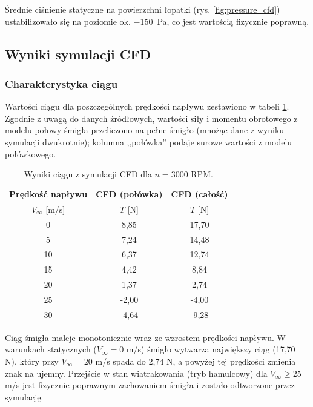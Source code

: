 \documentclass[12pt,a4paper,twoside]{article}
\begin{document}
	Średnie ciśnienie statyczne na powierzchni łopatki (rys. \ref{fig:pressure_cfd}) ustabilizowało się na poziomie ok. \SI{-150}{\pascal}, co jest wartością fizycznie poprawną.
	
	\subsection{Wyniki symulacji CFD}
	
	\subsubsection{Charakterystyka ciągu}
	Wartości ciągu dla poszczególnych prędkości napływu zestawiono w tabeli \ref{tab:thrust_results_cfd}. Zgodnie z uwagą do danych źródłowych, wartości siły i momentu obrotowego z modelu połowy śmigła przeliczono na pełne śmigło (mnożąc dane z wyniku symulacji dwukrotnie); kolumna ,,połówka'' podaje surowe wartości z modelu połówkowego.
	
	\begin{table}[H]
		\centering
		\caption{Wyniki ciągu z symulacji CFD dla \(n = 3000\) RPM.}
		\label{tab:thrust_results_cfd}
		\begin{tabular}{@{}c c c@{}}
			\toprule
			\textbf{Prędkość napływu} & \textbf{CFD (połówka)} & \textbf{CFD (całość)} \\
			\(V_\infty\) [m/s] & \(T\) [N] & \(T\) [N] \\
			\midrule
			0  & 8,85  & 17,70 \\
			5  & 7,24  & 14,48 \\
			10 & 6,37  & 12,74 \\
			15 & 4,42  & 8,84  \\
			20 & 1,37  & 2,74  \\
			25 & -2,00 & -4,00 \\
			30 & -4,64 & -9,28 \\
			\bottomrule
		\end{tabular}
	\end{table}
	
	Ciąg śmigła maleje monotonicznie wraz ze wzrostem prędkości napływu. W warunkach statycznych (\(V_\infty = 0\) m/s) śmigło wytwarza największy ciąg (17,70 N), który przy \(V_\infty = 20\) m/s spada do 2,74 N, a powyżej tej prędkości zmienia znak na ujemny. Przejście w stan wiatrakowania (tryb hamulcowy) dla \(V_\infty \ge 25\) m/s jest fizycznie poprawnym zachowaniem śmigła i zostało odtworzone przez symulację.
	
\end{document}
